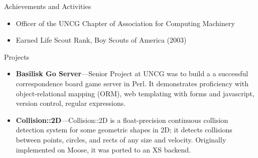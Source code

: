\documentclass[12pt,oneside]{article}
\newenvironment{ressection}[1]{
	\vspace{4pt}
	{\fontfamily{phv}\selectfont\Large#1}
	\begin{itemize}
	\vspace{3pt}
}{
	\end{itemize}
}
\newcommand{\resitem}[1]{
	\vspace{-4pt}
	\item \begin{flushleft} #1 \end{flushleft}
}
\newcommand{\ressubitem}[1]{
	\vspace{-1pt}
	\item \begin{flushleft} #1 \end{flushleft}
}
\newcommand{\resbigitem}[3]{
	\vspace{-5pt}
	\item
	\textbf{#1}---#2 \\
	\textit{#3}
}
\newenvironment{ressubsec}[3]{
	\resbigitem{#1}{#2}{#3}
	\vspace{-2pt}
	\begin{itemize}
}{
	\end{itemize}
}
\begin{document}
\begin{ressection}{Achievements and Activities}

	\resitem{Officer of the UNCG Chapter of Association for Computing Machinery}

	\resitem{Earned Life Scout Rank, Boy Scouts of America (2003)}


\end{ressection}


\begin{ressection}{Projects}

	\begin{ressubsec}{Basilisk Go Server}{Senior Project at UNCG was to build a a successful correspondence
         board game server in Perl. It demonstrates proficiency with object-relational mapping (ORM),
         web templating with forms and javascript, version control, regular expressions.}{}
	\end{ressubsec}
	\begin{ressubsec}{Collision::2D}{Collision::2D is a float-precision continuous collision detection
      system for some geometric shapes in 2D; it detects collisions between
      points, circles, and rects of any size and velocity.
      Originally implemented on Moose, it was ported to an XS backend.}{}
	\end{ressubsec}

\end{ressection}
\end{document}
